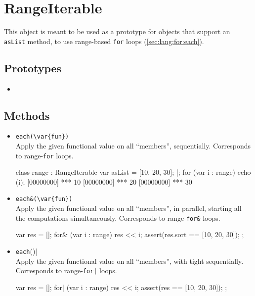 \section{RangeIterable}

This object is meant to be used as a prototype for objects that
support an \lstinline|asList| method, to use range-based
\lstinline|for| loops (\autoref{sec:lang:for:each}).

\subsection{Prototypes}

\begin{itemize}
\item {}
\end{itemize}

\subsection{Methods}

\begin{itemize}
\item \lstinline|each(\var{fun})|\\
  Apply the given functional value  on all ``members'',
  sequentially.  Corresponds to range-\lstinline|for| loops.
\begin{urbiscript}
class range : RangeIterable
{
  var asList = [10, 20, 30];
}|;
for (var i : range)
  echo (i);
[00000000] *** 10
[00000000] *** 20
[00000000] *** 30
\end{urbiscript}

\item \lstinline|each&(\var{fun})|\\
  Apply the given functional value  on all ``members'', in
  parallel, starting all the computations simultaneously.  Corresponds
  to range-\lstinline|for&| loops.
\begin{urbiscript}[firstnumber=last]
{
  var res = [];
  for& (var i : range)
    res << i;
  assert(res.sort == [10, 20, 30]);
};
\end{urbiscript}

\item \lstinline|each|()|\\
  Apply the given functional value  on all ``members'', with
  tight sequentially.  Corresponds to range-\lstinline'for|' loops.
\begin{urbiscript}[firstnumber=last]
{
  var res = [];
  for| (var i : range)
    res << i;
  assert(res == [10, 20, 30]);
};
\end{urbiscript}
\end{itemize}

